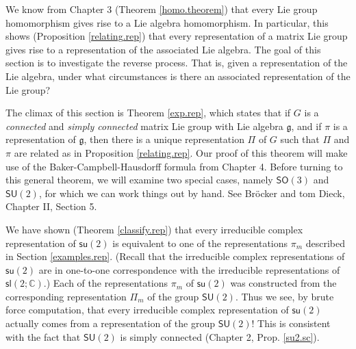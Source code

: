\documentclass{amsbook}
\let \frak = \mathfrak
\theoremstyle{plain}
\numberwithin{equation}{chapter}
\numberwithin{theorem}{chapter}
\begin{document}
We know from Chapter 3 (Theorem \ref{homo.theorem}) that every Lie group
homomorphism gives rise to a Lie algebra homomorphism. In particular, this
shows (Proposition \ref{relating.rep}) that every representation of a matrix
Lie group gives rise to a representation of the associated Lie algebra. The
goal of this section is to investigate the reverse process. That is, given a
representation of the Lie algebra, under what circumstances is there an
associated representation of the Lie group?

The climax of this section is Theorem \ref{exp.rep}, which states that if $G$
is a \textit{connected} and \textit{simply connected} matrix Lie group with
Lie algebra $\frak{g}$, and if $\pi$ is a representation of $\frak{g}$, then
there is a unique representation $\Pi$ of $G$ such that $\Pi$ and $\pi$ are
related as in Proposition \ref{relating.rep}. Our proof of this theorem will
make use of the Baker-Campbell-Hausdorff formula from Chapter 4. Before
turning to this general theorem, we will examine two special cases, namely
$\mathsf{SO}(3)$ and $\mathsf{SU}(2)$, for which we can work things out by
hand. See Br\"{o}cker and tom Dieck, Chapter II, Section 5.

We have shown (Theorem \ref{classify.rep}) that every irreducible complex
representation of $\mathsf{su}(2)$ is equivalent to one of the representations
$\pi_{m}$ described in Section \ref{examples.rep}. (Recall that the
irreducible complex representations of $\mathsf{su}(2)$ are in one-to-one
correspondence with the irreducible representations of $\mathsf{sl}%
(2;\mathbb{C})$.) Each of the representations $\pi_{m}$ of $\mathsf{su}(2)$
was constructed from the corresponding representation $\Pi_{m}$ of the group
$\mathsf{SU}(2)$. Thus we see, by brute force computation, that every
irreducible complex representation of $\mathsf{su}(2)$ actually comes from a
representation of the group $\mathsf{SU}(2)$! This is consistent with the fact
that $\mathsf{SU}(2)$ is simply connected (Chapter 2, Prop. \ref{su2.sc}).
\end{document}
